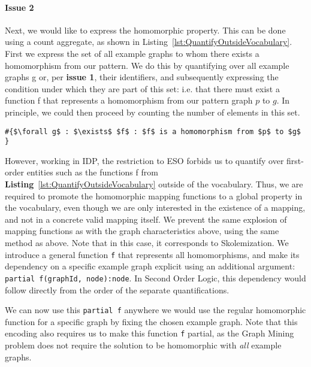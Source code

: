\paragraph{Issue 2}
Next, we would like to express the homomorphic property.
This can be done using a count aggregate, as shown in Listing~\ref{lst:QuantifyOutsideVocabulary}.
First we express the set of all example graphs to whom there exists a homomorphism from our pattern.
We do this by quantifying over all example graphs g or, per \textbf{issue 1}, their identifiers, and subsequently 
expressing the condition under which they are part of this set: i.e. that there must exist a function f that represents a homomorphism from our pattern graph $p$ to $g$.
In principle, we could then proceed by counting the number of elements in this set.

\begin{lstlisting}[mathescape, caption=Quantifying over functions outside the vocabulary, label=lst:QuantifyOutsideVocabulary,basicstyle=\fontfamily{lmvtt}\selectfont]
#{$\forall g$ : $\exists$ $f$ : $f$ is a homomorphism from $p$ to $g$ }
\end{lstlisting}
However, working in IDP, the restriction to ESO forbids us to quantify over first-order entities such as the functions f from \textbf{Listing}~\ref{lst:QuantifyOutsideVocabulary} outside of the vocabulary.
Thus, we are required to promote the homomorphic mapping functions to a global property in the vocabulary, even though we are only interested in the existence of a mapping, and not in a concrete valid mapping itself.
We prevent the same explosion of mapping functions as with the graph characteristics above, using the same method as above. Note that in this case, it corresponds to Skolemization.
We introduce a general function \verb|f| that represents all homomorphisms, and make its dependency on a specific example graph explicit using an additional argument:
\verb|partial f(graphId, node):node|.
In Second Order Logic, this dependency would follow directly from the order of the separate quantifications.

We can now use this \verb|partial f| anywhere we would use the regular homomorphic function for a specific graph by fixing the chosen example graph.
Note that this encoding also requires us to make this function \verb|f| partial, as the Graph Mining problem does not require the solution to be homomorphic with \emph{all} example graphs.


